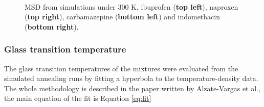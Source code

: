 \begin{figure}[htb]
	\centering
	\\
	\caption{MSD from simulations under 300 K, ibuprofen (\textbf{top left}), naproxen (\textbf{top right}), carbamazepine (\textbf{bottom left}) and indomethacin (\textbf{bottom right}).}
	\label{fig:msd_r1}    
\end{figure}

\subsubsection{Glass transition temperature}
The glass transition temperatures of the mixtures were evaluated from the simulated annealing runs by fitting a hyperbola to the temperature-density data. The whole methodology is described in the paper written by Alzate-Vargas et al.\cite{alzate-vargas_uncertainties_2018}, the main equation of the fit is Equation \ref{eq:fit}

